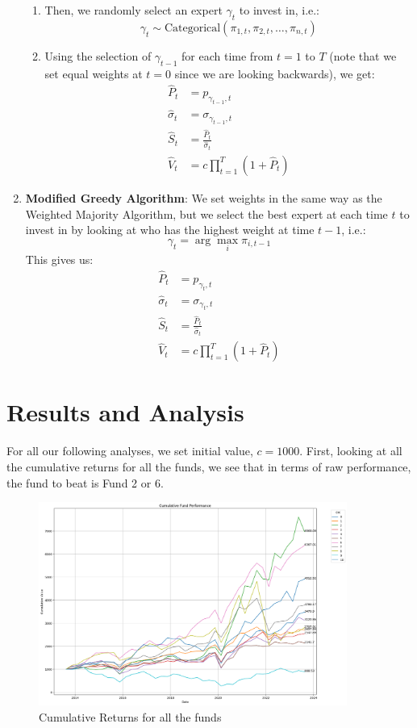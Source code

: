 \documentclass{article}
\begin{document}
\begin{enumerate}
\begin{enumerate}
        \item Then, we randomly select an expert $\gamma_{t}$ to invest in, i.e.:
        $$\gamma_{t} \sim \text{Categorical}(\pi_{1,t}, \pi_{2,t}, \ldots, \pi_{n,t})$$
        \item Using the selection of $\gamma_{t-1}$ for each time from $t=1$ to $T$ (note that we set equal weights at $t=0$ since we are looking backwards), we get:
        $$\begin{align*}\hat{P}_{t}&=p_{\gamma_{t-1},t}\\
            \hat{\sigma}_{t}&=\sigma_{\gamma_{t-1},t}\\
            \hat{S}_{t}&=\frac{\hat{P}_{t}}{\hat{\sigma}_{t}}\\
            \hat{V}_{t}&=c\prod_{t=1}^{T}(1+\hat{P}_{t})\end{align*}$$
    \end{enumerate}
    \item \textbf{Modified Greedy Algorithm}: We set weights in the same way as the Weighted Majority Algorithm, but we select the best expert at each time $t$ to invest in by looking at who has the highest weight at time $t-1$, i.e.:
    $$\gamma_{t}=\arg\max_{i}\pi_{i,t-1}$$
    This gives us:
    $$\begin{align*}\hat{P}_{t}&=p_{\gamma_{t},t}\\
        \hat{\sigma}_{t}&=\sigma_{\gamma_{t},t}\\
        \hat{S}_{t}&=\frac{\hat{P}_{t}}{\hat{\sigma}_{t}}\\
        \hat{V}_{t}&=c\prod_{t=1}^{T}(1+\hat{P}_{t})\end{align*}$$
\end{enumerate}

\section{Results and Analysis}
\label{sec:results-analysis}
For all our following analyses, we set initial value, $c=1000$. First, looking at all the cumulative returns for all the funds, we see that in terms of raw performance, the fund to beat is Fund 2 or 6.
\begin{figure}[H]
    \centering
    \includegraphics[width=0.9\textwidth]{cumulative_returns.png}
    \caption{Cumulative Returns for all the funds}
    \label{fig:cumulative_returns}
\end{figure}
\end{document}

